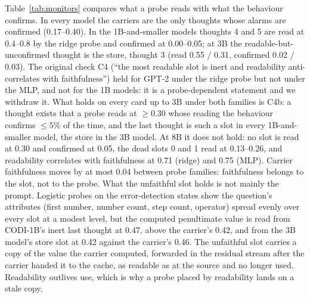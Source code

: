 \documentclass{article}
\begin{document}
Table~\ref{tab:monitors} compares what a probe reads with what the behaviour confirms. In every model the carriers are the only thoughts whose alarms are confirmed (0.17--0.40). In the 1B-and-smaller models thoughts 4 and 5 are read at 0.4--0.8 by the ridge probe and confirmed at 0.00--0.05; at 3B the readable-but-unconfirmed thought is the store, thought 3 (read 0.55 / 0.31, confirmed 0.02 / 0.03). The original check C4 (``the most readable slot is inert and readability anti-correlates with faithfulness'') held for GPT-2 under the ridge probe but not under the MLP, and not for the 1B models: it is a probe-dependent statement and we withdraw it. What holds on every card up to 3B under both families is C4b: a thought exists that a probe reads at $\geq 0.30$ whose reading the behaviour confirms $\leq 5\%$ of the time, and the last thought is such a slot in every 1B-and-smaller model, the store in the 3B model. At 8B it does not hold: no slot is read at 0.30 and confirmed at 0.05, the dead slots 0 and 1 read at 0.13--0.26, and readability correlates with faithfulness at 0.71 (ridge) and 0.75 (MLP). Carrier faithfulness moves by at most 0.04 between probe families: faithfulness belongs to the slot, not to the probe. What the unfaithful slot holds is not mainly the prompt. Logistic probes on the error-detection states show the question's attributes (first number, number count, step count, operator) spread evenly over every slot at a modest level, but the computed penultimate value is read from CODI-1B's inert last thought at 0.47, above the carrier's 0.42, and from the 3B model's store slot at 0.42 against the carrier's 0.46. The unfaithful slot carries a copy of the value the carrier computed, forwarded in the residual stream after the carrier handed it to the cache, as readable as at the source and no longer used. Readability outlives use, which is why a probe placed by readability lands on a stale copy.
\end{document}
